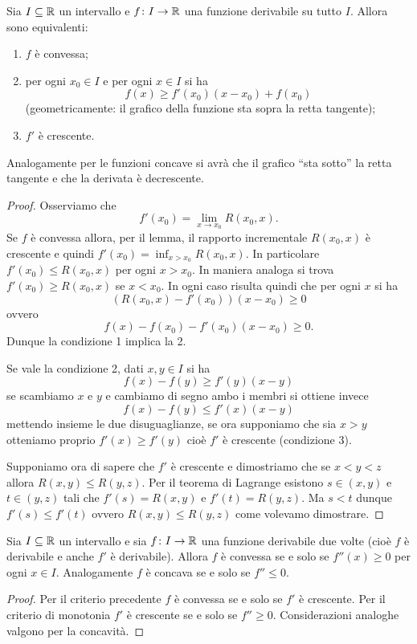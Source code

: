 \begin{theorem}
\mymark{***}
Sia $I\subseteq {\mathbb R}$ un intervallo e $f\colon I \to {\mathbb R}$ una funzione derivabile su tutto $I$.
Allora sono equivalenti:
\begin{enumerate}
\item $f$ è convessa;
\item per ogni $x_0 \in I$ e per ogni $x\in I$ si ha
\[
   f(x) \ge f'(x_0) (x-x_0) + f(x_0)
\]
(geometricamente: il grafico della funzione sta sopra la retta tangente);
\item $f'$ è crescente.
\end{enumerate}

Analogamente per le funzioni concave si avrà che il grafico ``sta sotto'' la retta tangente e che la derivata è decrescente.
\end{theorem}
%
\begin{proof}
\mymark{**}
Osserviamo che
\[
  f'(x_0) = \lim_{x\to x_0} R(x_0,x).
\]
Se $f$ è convessa allora, per il lemma, il rapporto incrementale $R(x_0,x)$ è crescente e quindi  $f'(x_0) = \inf_{x>x_0} R(x_0,x)$. In particolare $f'(x_0) \le R(x_0,x)$ per ogni $x> x_0$. In maniera analoga si trova $f'(x_0) \ge R(x_0,x)$ se $x<x_0$.
In ogni caso risulta quindi che per ogni $x$ si ha
\[
(R(x_0,x)- f'(x_0))(x-x_0)\ge 0
\]
ovvero
\[
  f(x) - f(x_0) - f'(x_0)(x-x_0) \ge 0.
\]
Dunque la condizione 1 implica la 2.

Se vale la condizione 2, dati $x,y \in I$ si ha
\[
  f(x) - f(y) \ge f'(y)(x-y)
\]
se scambiamo $x$ e $y$ e cambiamo di segno ambo i membri si ottiene invece
\[
  f(x) - f(y) \le f'(x)(x-y)
\]
mettendo insieme le due disuguaglianze,
se ora supponiamo che sia $x>y$ otteniamo proprio
$f'(x) \ge f'(y)$ cioè $f'$ è crescente (condizione 3).

Supponiamo ora di sapere che $f'$ è crescente 
e dimostriamo che se $x<y<z$ allora $R(x,y) \le R(y,z)$.
Per il teorema di Lagrange esistono $s\in (x,y)$ 
e $t\in (y,z)$ tali che $f'(s) = R(x,y)$ e $f'(t) = R(y,z)$.
Ma $s<t$ dunque $f'(s) \le f'(t)$ ovvero $R(x,y) \le R(y,z)$
come volevamo dimostrare.
\end{proof}

\begin{corollary}
\mymark{***}
Sia $I\subseteq {\mathbb R}$ un intervallo e sia $f\colon I \to {\mathbb R}$ una funzione derivabile due volte (cioè $f$ è derivabile e anche $f'$ è derivabile).
Allora $f$ è convessa se e solo se $f''(x)\ge 0$ per ogni $x\in I$.
Analogamente $f$ è concava se e solo se $f''\le 0$.
\end{corollary}
\begin{proof}
\mymark{***}
Per il criterio precedente $f$ è convessa se e solo se $f'$ è crescente. Per il criterio di monotonia $f'$ è crescente se e solo se $f'' \ge 0$. Considerazioni analoghe valgono per la concavità.
\end{proof}

